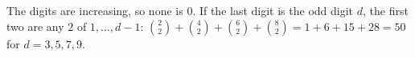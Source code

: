 The digits are increasing, so none is $0$. If the last digit is the odd digit $d$, the first two are any $2$ of $1,\dots,d-1$: $\binom22+\binom42+\binom62+\binom82=1+6+15+28=\boxed{50}$ for $d=3,5,7,9$.
